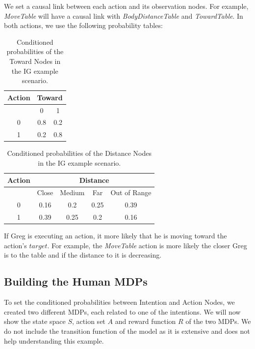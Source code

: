 We set a causal link between each action and its observation nodes. For example, \textit{MoveTable} will have a causal link with \textit{BodyDistanceTable} and \textit{TowardTable}. In both actions, we use the following probability tables:

 \begin{table}[h!]
\centering
\begin{tabular}{|c|c|c|}
\hline
Action & \multicolumn{2}{|c|}{Toward} \\ \hline \hline
& 0 & 1 \\ \hline
0  & 0.8 & 0.2 \\ \hline
1 & 0.2 & 0.8 \\  \hline
\end{tabular}
\caption[Belief models in the IG scenario]{Conditioned probabilities of the Toward Nodes in the IG example scenario.}
 \label{table:intention-ig_toward}    
\end{table}

 \begin{table}[h!]
\centering
\begin{tabular}{|c|c|c|c|c|}
\hline
Action & \multicolumn{4}{|c|}{Distance} \\ \hline \hline
& Close & Medium & Far & Out of Range \\ \hline
0  & 0.16 & 0.2 & 0.25 & 0.39 \\ \hline
1 & 0.39 & 0.25 & 0.2 & 0.16 \\ \hline
\end{tabular}
\caption[Belief models in the IG scenario]{Conditioned probabilities of the Distance Nodes in the IG example scenario.}
 \label{table:intention-ig_distance}    
\end{table}

If Greg is executing an action, it  more likely that he is moving toward the action's $target$. For example, the \textit{MoveTable} action is more likely the closer Greg is to the table and if the distance to it is decreasing.

\subsection{Building the Human MDPs}
To set the conditioned probabilities between Intention and Action Nodes, we created two different MDPs, each related to one of the intentions. We will now show the state space $S$, action set $A$ and reward function $R$  of the two MDPs. We do not include the transition function of the model as it is extensive and does not help understanding this example.

